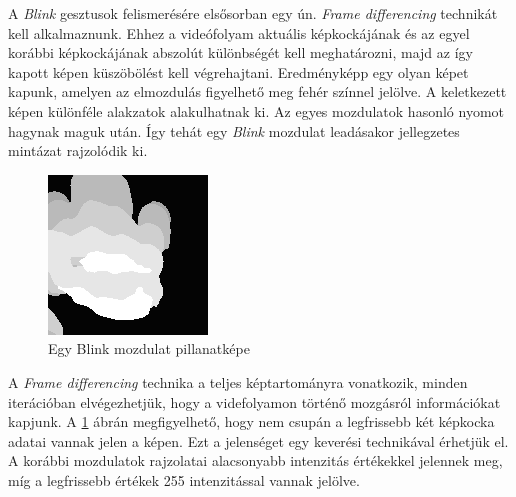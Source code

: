 

A \textit{Blink} gesztusok felismerésére elsősorban egy ún. \textit{Frame differencing} technikát kell alkalmaznunk.
Ehhez a videófolyam aktuális képkockájának és az egyel korábbi képkockájának abszolút különbségét kell meghatározni, majd az így kapott képen küszöbölést kell végrehajtani. Eredményképp egy olyan képet kapunk, amelyen az elmozdulás figyelhető meg fehér színnel jelölve. A keletkezett képen különféle alakzatok alakulhatnak ki. Az egyes mozdulatok hasonló nyomot hagynak maguk után. Így tehát egy \textit{Blink} mozdulat leadásakor jellegzetes mintázat rajzolódik ki.

\begin{figure}[h]
\centering
\includegraphics[width=5truecm, height=5truecm]{images/Grab_screenshot.png}
\caption{Egy Blink mozdulat pillanatképe}
\label{fig:blink}
\end{figure}

A \textit{Frame differencing} technika a teljes képtartományra vonatkozik, minden iterációban elvégezhetjük, hogy a videfolyamon történő mozgásról információkat kapjunk. A \ref{fig:blink} ábrán megfigyelhető, hogy nem csupán a legfrissebb két képkocka adatai vannak jelen a képen. Ezt a jelenséget egy keverési technikával érhetjük el. A korábbi mozdulatok rajzolatai alacsonyabb intenzitás értékekkel jelennek meg, míg a legfrissebb értékek 255 intenzitással vannak jelölve.

